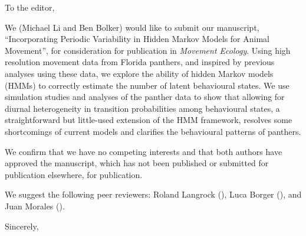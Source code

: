 \documentclass[10pt]{letter}
\begin{document}
\date{\today}

\begin{letter}{
} 

\opening{To the editor,}

We (Michael Li and Ben Bolker) would like to submit our manuscript,
``Incorporating Periodic Variability in Hidden Markov Models for
Animal Movement'', for consideration for publication in \emph{Movement
  Ecology}. Using high resolution movement data from Florida panthers,
and inspired by previous analyses using these data, we explore the
ability of hidden Markov models (HMMs) to correctly estimate the
number of latent behavioural states.  We use simulation studies and
analyses of the panther data to show that allowing for diurnal
heterogeneity in transition probabilities among behavioural states, a
straightforward but little-used extension of the HMM framework,
resolves some shortcomings of current models and clarifies the
behavioural patterns of panthers.

We confirm that we have no competing interests and that both authors
have approved the manuscript, which has not been published or
submitted for publication elsewhere, for publication.

We suggest the following peer reviewers: Roland Langrock (),
Luca Borger (), and Juan Morales ().

\closing{Sincerely,}


\end{letter}
\end{document}
